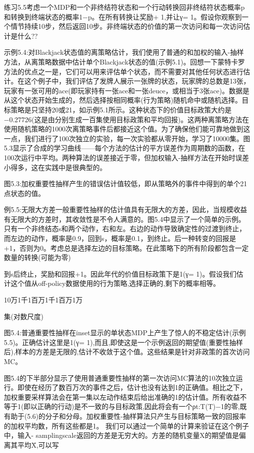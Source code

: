 练习5.5考虑一个MDP和一个非终结符状态和一个行动转换回非终结符状态概率p和转换到终端状态的概率1−p。在所有转换让奖励+ 1,并让γ= 1。假设你观察到一个情节持续10步，然后返回10步。非终端状态的价值的第一次访问和每一次访问估计是什么??

示例5.4:对Blackjack状态值的离策略估计，我们使用了普通的和加权的输入-抽样方法，从离策略数据中估计单个Blackjack状态的值(示例5.1)。回想一下蒙特卡罗方法的优点之一是，它们可以用来评估单个状态，而不需要对其他任何状态进行估计。在这个例子中，我们评估了发牌人展示一张牌的状态，玩家牌的总数是13张，玩家有一张可用的ace(即玩家持有一张ace和一张deuce，或相当于3张ace)。数据是从这个状态开始生成的，然后选择按相同概率(行为策略)随机命中或随机选择。目标策略是只坚持20或21，如示例5.1所示。这种状态下的价值目标政策大约是−0.27726(这是由分别生成一百集使用目标政策和平均回报)。这两种离策略方法在使用随机策略的1000次离策略事件后都接近这个值。为了确保他们能可靠地做到这一点，我们进行了100次独立的实验，每一次实验都从零开始，学习了10000集。图5.3显示了合成的学习曲线——每个方法的估计的平方误差作为周期数的函数，在100次运行中平均。两种算法的误差接近于零，但加权输入-抽样方法在开始时误差小得多，这在实践中是很典型的。
 
图5.3:加权重要性抽样产生的错误估计值较低，即从策略外的事件中得到的单个21点状态的值。


例5.5:无限大方差一般重要性抽样的估计值具有无限大的方差，因此，当规模收益有无限大的方差时，其收敛性是不令人满意的。图5.4中显示了一个简单的示例。只有一个非终结态s和两个动作，右和左。右边的动作导致确定性的过渡到终止，而左边的动作，概率是0.9，回到s，概率是0.1，到终止。后一种转变的回报是+1，否则为0。考虑总是选择左边的目标策略。在此策略下的所有阶段都包含一定数量的转换(可能为零)

到s后终止，奖励和回报+1。因此年代的价值目标政策下是1(γ= 1)。假设我们估计这个值从off-policy数据使用的行为策略,选择正确的,剩下的概率相等。
 
10万1千1百万1千1百万1万

集(对数尺度)

图5.4:普通重要性抽样在inset显示的单状态MDP上产生了惊人的不稳定估计(示例5.5)。正确估计这里是1(γ= 1),而且,即使这是一个示例返回的期望值(重要性抽样后),样本的方差是无限的,估计不收敛于这个值。这些结果是针对非政策的首次访问MC。

图5.4的下半部分显示了使用普通重要性抽样的第一次访问MC算法的10次独立运行。即使在经历了数百万次的事件之后，估计也没有达到1的正确值。相比之下，加权重要采样算法会在第一集以左动作结束后给出准确的1的估计值。所有收益不等于1(即以正确的行动)是不一致的与目标政策,因此将会有一个ρt:T(T)−1的零,既有助于(5.6)的分子和分母。加权重要性-抽样算法只产生与目标策略一致的回报率的加权平均数，所有这些都是1。
我们可以通过一个简单的计算来验证在这个例子中，输入- samplingscale返回的方差是无穷大的。方差的随机变量X的期望值是偏离其平均X̄,可以写

